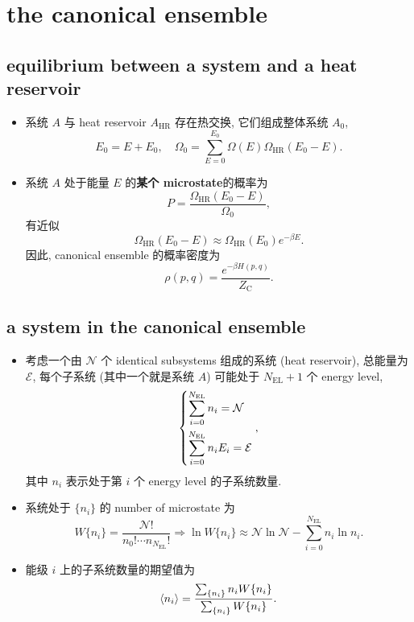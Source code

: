 \chapter{the canonical ensemble}
\section{equilibrium between a system and a heat reservoir}
\begin{itemize}
	\item 系统 $A$ 与 heat reservoir $A_\text{HR}$ 存在热交换, 它们组成整体系统 $A_0$,
	\begin{equation}
		E_0 = E + E_\text{0}, \quad \Omega_0 = \sum_{E = 0}^{E_0} \Omega(E) \Omega_\text{HR}(E_0 - E).
	\end{equation}
	
	\item 系统 $A$ 处于能量 $E$ 的\textbf{某个 microstate}的概率为
	\begin{equation}
		P = \frac{\Omega_\text{HR}(E_0 - E)}{\Omega_0},
	\end{equation}
	有近似
	\begin{equation}
		\Omega_\text{HR}(E_0 - E) \approx \Omega_\text{HR}(E_0) e^{- \beta E}.
	\end{equation}
	因此, canonical ensemble 的概率密度为
	\begin{equation}
		\rho(p, q) = \frac{e^{- \beta H(p, q)}}{Z_\text{C}}.
	\end{equation}
\end{itemize}

\section{a system in the canonical ensemble}
\begin{itemize}
	\item 考虑一个由 $\mathcal{N}$ 个 identical subsystems 组成的系统 (heat reservoir), 总能量为 $\mathcal{E}$, 每个子系统 (其中一个就是系统 $A$) 可能处于 $N_\text{EL} + 1$ 个 energy level,
	\begin{equation} \label{3.2.1}
		\begin{dcases}
			\sum_{i = 0}^{N_\text{EL}} n_i = \mathcal{N} \\
			\sum_{i = 0}^{N_\text{EL}} n_i E_i = \mathcal{E}
		\end{dcases},
	\end{equation}
	其中 $n_i$ 表示处于第 $i$ 个 energy level 的子系统数量.
	
	\item 系统处于 $\{n_i\}$ 的 number of microstate 为
	\begin{equation}
		W\{n_i\} = \frac{\mathcal{N}!}{n_0! \cdots n_{N_\text{EL}}!} \Longrightarrow \ln W\{n_i\} \approx \mathcal{N} \ln \mathcal{N} - \sum_{i = 0}^{N_\text{EL}} n_i \ln n_i.
	\end{equation}
	
	\item 能级 $i$ 上的子系统数量的期望值为
	\begin{equation} \label{3.2.3}
		\braket{n_i} = \frac{\sum_{\{n_i\}} n_i W\{n_i\}}{\sum_{\{n_i\}} W\{n_i\}}.
	\end{equation}
\end{itemize}

